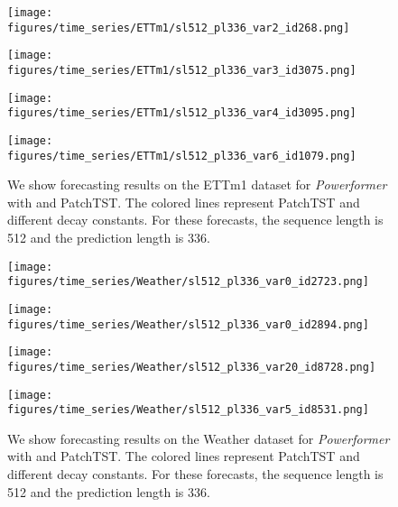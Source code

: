 \begin{figure}[!hb]
\begin{minipage}{.5\textwidth}
    \texttt{[image: figures/time\_series/ETTm1/sl512\_pl336\_var2\_id268.png]}
\end{minipage}
\hfill    
\begin{minipage}{.5\textwidth}
    \texttt{[image: figures/time\_series/ETTm1/sl512\_pl336\_var3\_id3075.png]}
\end{minipage}
\begin{minipage}{.5\textwidth}
    \texttt{[image: figures/time\_series/ETTm1/sl512\_pl336\_var4\_id3095.png]}
\end{minipage}
\hfill 
\begin{minipage}{.5\textwidth}
    \texttt{[image: figures/time\_series/ETTm1/sl512\_pl336\_var6\_id1079.png]}
\end{minipage}
\caption{We show forecasting results on the ETTm1 dataset for \emph{Powerformer} with \fpl{} and PatchTST. The colored lines represent PatchTST and different \fpl{} decay constants. For these forecasts, the sequence length is 512 and the prediction length is 336.}
\end{figure}


\begin{figure}[!hb]
\begin{minipage}{.5\textwidth}
    \texttt{[image: figures/time\_series/Weather/sl512\_pl336\_var0\_id2723.png]}
\end{minipage}
\hfill    
\begin{minipage}{.5\textwidth}
    \texttt{[image: figures/time\_series/Weather/sl512\_pl336\_var0\_id2894.png]}
\end{minipage}
\begin{minipage}{.5\textwidth}
    \texttt{[image: figures/time\_series/Weather/sl512\_pl336\_var20\_id8728.png]}
\end{minipage}
\hfill    
\begin{minipage}{.5\textwidth}
    \texttt{[image: figures/time\_series/Weather/sl512\_pl336\_var5\_id8531.png]}
\end{minipage}
\caption{We show forecasting results on the Weather dataset for \emph{Powerformer} with \fpl{} and PatchTST. The colored lines represent PatchTST and different \fpl{} decay constants. For these forecasts, the sequence length is 512 and the prediction length is 336.}
\end{figure}
